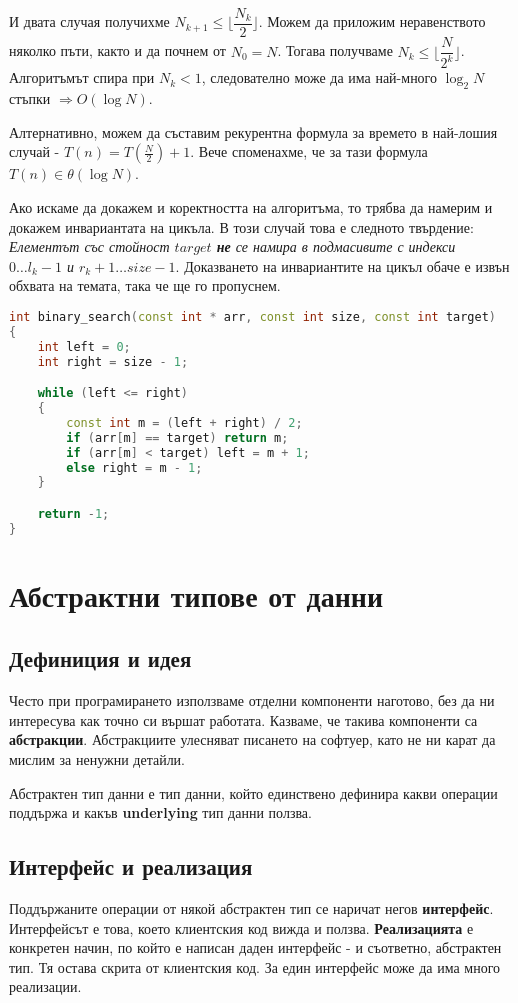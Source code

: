 \documentclass[fleqn,12pt]{article}
\begin{document}
И двата случая получихме $N_{k+1} \leq \Bigg\lfloor \dfrac{N_k}{2} \Bigg\rfloor$.
Можем да приложим неравенството няколко пъти, както и да почнем от $N_0 = N$. 
Тогава получваме $N_k \leq \Bigg\lfloor \dfrac{N}{2^k} \Bigg\rfloor$. Алгоритъмът спира при $N_k < 1$,
следователно може да има най-много $\log_2 N$ стъпки $\Rightarrow O(\log N)$.

Алтернативно, можем да съставим рекурентна формула за времето в най-лошия случай - $T(n) = T\left(\frac{N}{2}\right) + 1$.
Вече споменахме, че за тази формула $T(n) \in \theta(\log N)$. 

Ако искаме да докажем и коректността на алгоритъма, то трябва да намерим и докажем инвариантата на цикъла.
В този случай това е следното твърдение: \textit{Елементът със стойност $target$ \textbf{не} се намира в подмасивите с индекси $0 \dots l_k - 1$ и $r_k + 1 \dots size - 1$}.
Доказването на инвариантите на цикъл обаче е извън обхвата на темата, така че ще го пропуснем.

\begin{lstlisting}[language=C++, caption=Двоично търсене]
int binary_search(const int * arr, const int size, const int target)
{
    int left = 0;
    int right = size - 1;

    while (left <= right)
    {
        const int m = (left + right) / 2;
        if (arr[m] == target) return m;
        if (arr[m] < target) left = m + 1;
        else right = m - 1;
    }

    return -1;
}
\end{lstlisting}
    

\section{Абстрактни типове от данни}
\subsection{Дефиниция и идея}
Често при програмирането използваме отделни компоненти наготово, без да ни интересува как точно си вършат работата.
Казваме, че такива компоненти са \textbf{абстракции}. Абстракциите улесняват писането на софтуер, като не ни карат 
да мислим за ненужни детайли.

Абстрактен тип данни е тип данни, който единствено дефинира какви операции поддържа и какъв \textbf{underlying} тип данни ползва.

\subsection{Интерфейс и реализация}
Поддържаните операции от някой абстрактен тип се наричат негов \textbf{интерфейс}. Интерфейсът е това, което клиентския код 
вижда и ползва. \textbf{Реализацията} е конкретен начин, по който е написан даден интерфейс - и съответно, абстрактен тип.
Тя остава скрита от клиентския код. За един интерфейс може да има много реализации.
\end{document}
